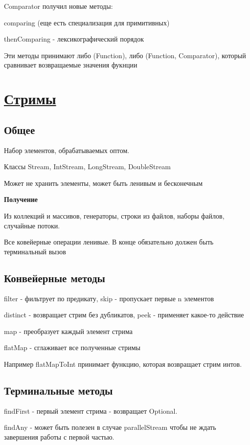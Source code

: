 \documentclass{article}
\begin{document}
Comparator получил новые методы:

comparing (еще есть специализация для примитивных)

thenComparing - лексикографический порядок

Эти методы принимают либо (Function), либо (Function, Comparator), который сравнивает возвращаемые значения фукнции

\section{\underline{Стримы}}

\subsection{Общее}

Набор элементов, обрабатываемых оптом.

Классы Stream, IntStream, LongStream, DoubleStream

Может не хранить элементы, может быть ленивым и бесконечным

\textbf{Получение}

Из коллекций и массивов, генераторы, строки из файлов, наборы файлов, случайные потоки.

Все ковейерные операции ленивые. В конце обязательно должен быть терминальный вызов

\subsection{Конвейерные методы}

filter - фильтрует по предикату, skip - пропускает первые n элементов

distinct - возвращает стрим без дубликатов, peek - применяет какое-то действие

map - преобразует каждый элемент стрима

flatMap - сглаживает все полученные стримы

Например flatMapToInt принимает функцию, которая возвращает стрим интов.

\subsection{Терминальные методы}

findFirst - первый элемент стрима - возвращает Optional.

findAny - может быть полезен в случае parallelStream чтобы не ждать завершения работы с первой частью.
\end{document}
